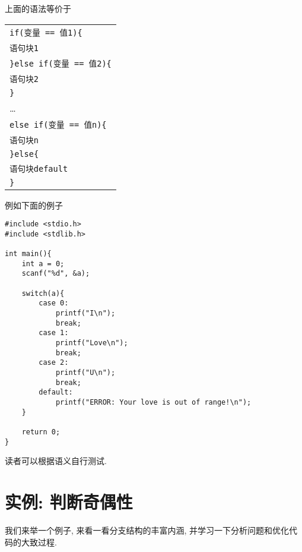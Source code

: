                 上面的语法等价于
                \begin{center}
                \begin{longtable}{l}
                    \texttt{if(变量 == 值\hspace*{-0.25pt}\texttt{1})\{} \\
                    \qquad \texttt{语句块\hspace*{-0.25pt}\texttt{1}} \\
                    \texttt{\}else if(变量 == 值\hspace*{-0.25pt}\texttt{2})\{} \\
                    \qquad \texttt{语句块\hspace*{-0.25pt}\texttt{2}} \\
                    \texttt{\}} \\
                    \dots \\
                    \texttt{else if(变量 == 值\hspace*{-0.25pt}\texttt{n})\{} \\
                    \qquad \texttt{语句块\hspace*{-0.25pt}\texttt{n}} \\
                    \texttt{\}else\{} \\
                    \qquad \texttt{语句块\hspace*{-0.25pt}\texttt{default}} \\
                    \texttt{\}}
                \end{longtable}
                \end{center}

                例如下面的例子
\begin{lstlisting}
#include <stdio.h>
#include <stdlib.h>

int main(){
    int a = 0;
    scanf("%d", &a);

    switch(a){
        case 0:
            printf("I\n");
            break;
        case 1:
            printf("Love\n");
            break;
        case 2:
            printf("U\n");
            break;
        default:
            printf("ERROR: Your love is out of range!\n");
    }

    return 0;
}
\end{lstlisting}

                读者可以根据语义自行测试.

    \section{实例: 判断奇偶性}
        我们来举一个例子, 来看一看分支结构的丰富内涵, 并学习一下分析问题和优化代码的大致过程.

